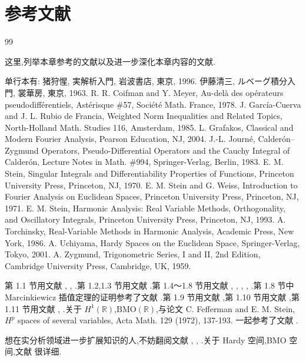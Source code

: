 \section*{参考文献}
\begin{thebibliography}{99}
\newfontfamily{}
\item[] 这里,列举本章参考的文献以及进一步深化本章内容的文献.
\item[] 单行本有:
 {\jpref 猪狩惺, 実解析入門, 岩波書店, 東京, 1996.}
 {\jpref 伊藤清三, ルベーグ積分入門, 裳華房, 東京, 1963.}
 R. R. Coifman and Y. Meyer, Au-delà des opérateurs pseudodifférentiels, Astérisque \#57, Société Math. France, 1978.
 J. García-Cuerva and J. L. Rubio de Francia, Weighted Norm Inequalities and Related Topics, North-Holland Math. Studies 116, Amsterdam, 1985.
 L. Grafakos, Classical and Modern Fourier Analysis, Pearson Education, NJ, 2004.
 J.-L. Journé, Calderón--Zygmund Operators, Pseudo-Differential Operators and the Cauchy Integral of Calderón, Lecture Notes in Math. \#994, Springer-Verlag, Berlin, 1983.
 E. M. Stein, Singular Integrals and Differentiability Properties of Functions, Princeton University Press, Princeton, NJ, 1970.
 E. M. Stein and G. Weiss, Introduction to Fourier Analysis on Euclidean Spaces, Princeton University Press, Princeton, NJ, 1971.
 E. M. Stein, Harmonic Analysis: Real Variable Methods, Orthogonality, and Oscillatory Integrals, Princeton University Press, Princeton, NJ, 1993.
 A. Torchinsky, Real-Variable Methods in Harmonic Analysis, Academic Press, New York, 1986.
 A. Uchiyama, Hardy Spaces on the Euclidean Space, Springer-Verlag, Tokyo, 2001.
 A. Zygmund, Trigonometric Series, I and II, 2nd Edition, Cambridge University Press, Cambridge, UK, 1959.
\item[] 第 1.1 节用文献 \cite{ch1:1}, \cite{ch1:2}, \cite{ch1:3}.第 1.2,1.3 节用文献 \cite{ch1:8}.第 1.4～1.8 节用文献 \cite{ch1:4}, \cite{ch1:5}, \cite{ch1:6}, \cite{ch1:7}, \cite{ch1:10}.第 1.8 节中 Marcinkiewicz 插值定理的证明参考了文献 \cite{ch1:12}.第 1.9 节用文献 \cite{ch1:3},第 1.10 节用文献 \cite{ch1:5},第 1.11 节用文献 \cite{ch1:4}, \cite{ch1:5}.关于 $H^{1}(\mathbb{R})$,$\mathrm{BMO}(\mathbb{R})$,与论文 C. Fefferman and E. M. Stein, $H^{p}$ spaces of several variables, Acta Math. 129 (1972), 137-193. 一起参考了文献 \cite{ch1:11}.
\item[] 想在实分析领域进一步扩展知识的人,不妨翻阅文献 \cite{ch1:5}, \cite{ch1:7}, \cite{ch1:9}.关于 Hardy 空间,BMO 空间,文献 \cite{ch1:11} 很详细.
\end{thebibliography}